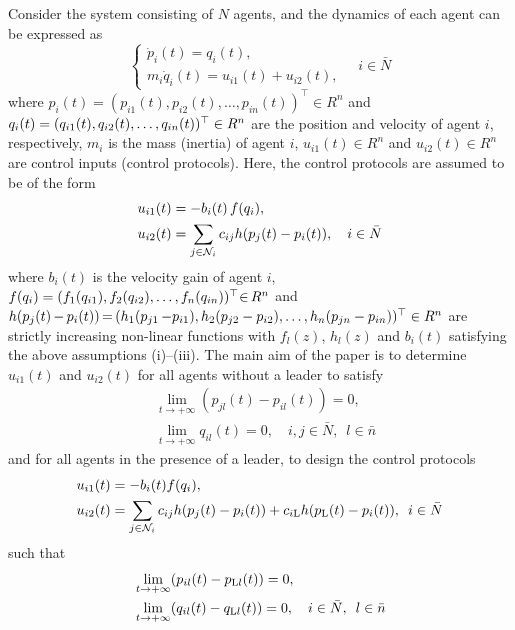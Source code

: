 \documentclass{cta-author}
\begin{document}
Consider the system consisting of $N$ agents, and the dynamics of each agent can be expressed as
\begin{equation}\label{eq1}
\begin{cases}
\dot{p}_{i}(t) = q_{i}(t),\\
m_{i}\dot{q}_{i}(t)=u_{i1}(t)+u_{i2}(t),
\end{cases} \quad i\in\bar{N}
\end{equation}
where $p_{i}(t)=(p_{i1}(t), p_{i2}(t),\ldots, p_{in}(t))^{\top}\in
R^{n}$ and $q_{i}(t)=\break (q_{i1}(t), q_{i2}(t),\ldots,
q_{in}(t))^{\top}\in R^{n}$ are the position and velocity of agent
$i$, respectively, $m_{i}$ is the mass (inertia) of agent $i$,
$u_{i1}(t)\in R^{n}$ and $u_{i2}(t)\in R^{n}$ are control inputs
(control protocols). Here, the control protocols are assumed to be
of the form
\begin{align}\label{eq2}
u_{i1}(t)&=-b_{i}(t)\,f(q_{i}),\notag\\
u_{i2}(t)&=\sum_{j\in \mathcal{N}_{i}}c_{ij}h(p_{j}(t)-p_{i}(t)),\quad i\in\bar{N}
\end{align}
where $b_{i}(t)$ is the velocity gain of agent $i$,
$f(q_{i})=(f_{1}(q_{i1}),\break  f_{2}(q_{i2}),\ldots,f_{n}(q_{in}))^{\top\!}\,{\in}\,
R^{n}$ and $h(p_{j}(t)\,{-}\,p_{i}(t))\,{=}\,(h_{1}(p_{j1}\,{-}\break p_{i1}),
h_{2}(p_{j2}-p_{i2}),\ldots,h_{n}(p_{jn}-p_{in}))^{\top}\in R^{n}$
are strictly increasing non-linear functions with $f_{l}(z)$, $h_{l}(z)$
and $b_{i}(t)$ satisfying the above assumptions (i)--(iii). The main
aim of the paper is to determine $u_{i1}(t)$ and $u_{i2}(t)$ for all
agents without a leader to satisfy
\begin{align*}
&\lim_{t\rightarrow +\infty}(p_{jl}(t)-p_{il}(t))=0,\\
&\lim_{t\rightarrow  +\infty}q_{il}(t)=0,\quad i,j\in\bar{N},\enspace l\in\bar{n}
\end{align*}
and for all agents in the presence of a leader, to design the control
protocols
\begin{align}\label{eq3}
u_{i1}(t)&=-b_{i}(t)f(q_{i}),\notag\\
u_{i2}(t)&=\sum_{j\in\mathcal{N}_{i}}c_{ij}h(p_{j}(t)-p_{i}(t))+c_{i{\rm L}}h (p_{\rm L}(t)-p_{i}(t)),\enspace i\in\bar{N}
\end{align}
such that
\begin{align*}
&\lim_{t\rightarrow  +\infty} (p_{il}(t)-p_{{\rm L}l}(t))=0,\\
&\lim_{t\rightarrow +\infty}(q_{il}(t)-q_{{\rm L}l}(t))=0,\quad
i\in\bar{N},\enspace l\in\bar{n}
\end{align*}
\end{document}
